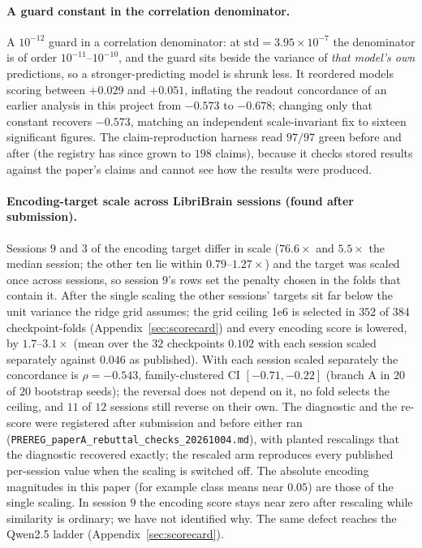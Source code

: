 \documentclass{article}
\begin{document}
\paragraph{A guard constant in the correlation denominator.} A $10^{-12}$ guard in a correlation
denominator: at $\mathrm{std} = 3.95\times10^{-7}$ the denominator is of order $10^{-11}$--$10^{-10}$,
and the guard sits beside the variance of \emph{that model's own} predictions, so a
stronger-predicting model is shrunk less. It reordered models scoring between $+0.029$ and
$+0.051$, inflating the readout concordance of an earlier analysis in this project from
$-0.573$ to $-0.678$; changing only that constant recovers $-0.573$, matching an independent
scale-invariant fix to sixteen significant figures. The claim-reproduction harness read $97/97$
green before and after (the registry has since grown to $198$ claims), because it checks stored results against the paper's claims and cannot
see how the results were produced.

\paragraph{Encoding-target scale across LibriBrain sessions (found after submission).} Sessions $9$
and $3$ of the encoding target differ in scale ($76.6\times$ and $5.5\times$ the median session; the
other ten lie within $0.79$--$1.27\times$) and the target was scaled once across sessions, so session
$9$'s rows set the penalty chosen in the folds that contain it. After the single scaling the other
sessions' targets sit far below the unit variance the ridge grid assumes; the grid ceiling 1e6 is
selected in $352$ of $384$ checkpoint-folds (Appendix~\ref{sec:scorecard}) and every encoding score is
lowered, by $1.7$--$3.1\times$ (mean over the $32$ checkpoints $0.102$ with each session scaled
separately against $0.046$ as published). With each session scaled separately the concordance is
$\rho = -0.543$, family-clustered CI $[-0.71, -0.22]$ (branch A in $20$ of $20$ bootstrap seeds); the
reversal does not depend on it, no fold selects the ceiling, and $11$ of $12$ sessions still reverse
on their own. The diagnostic and the re-score were registered after submission and before either ran
(\texttt{PREREG\_paperA\_rebuttal\_checks\_20261004.md}),
with planted rescalings that the diagnostic recovered exactly; the rescaled arm reproduces every
published per-session value when the scaling is switched off. The absolute encoding magnitudes in this
paper (for example class means near $0.05$) are those of the single scaling. In session $9$ the encoding
score stays near zero after rescaling while similarity is ordinary; we have not identified why. The
same defect reaches the Qwen2.5 ladder (Appendix~\ref{sec:scorecard}).
\end{document}
